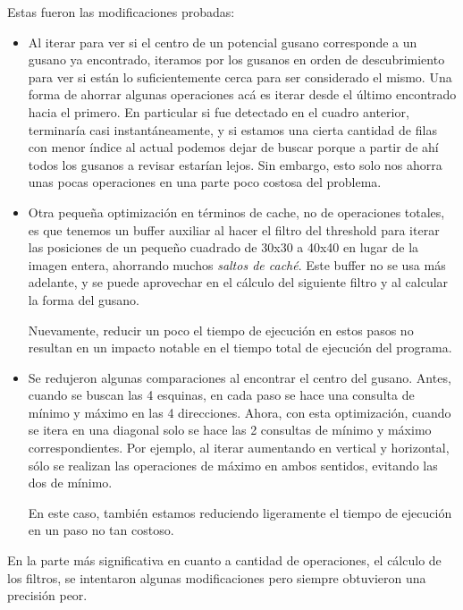 \documentclass{article}
\begin{document}
Estas fueron las modificaciones probadas:
\begin{itemize}

\item Al iterar para ver si el centro de un potencial gusano corresponde a un gusano ya encontrado, iteramos por los gusanos en orden de descubrimiento para ver si están lo suficientemente cerca para ser considerado el mismo. Una forma de ahorrar algunas operaciones acá es iterar desde el último encontrado hacia el primero. En particular si fue detectado en el cuadro anterior, terminaría casi instantáneamente, y si estamos una cierta cantidad de filas con menor índice al actual podemos dejar de buscar porque a partir de ahí todos los gusanos a revisar estarían lejos. Sin embargo, esto solo nos ahorra unas pocas operaciones en una parte poco costosa del problema.

\item Otra pequeña optimización en términos de cache, no de operaciones totales, es que tenemos un buffer auxiliar al hacer el filtro del threshold para iterar las posiciones de un pequeño cuadrado de 30x30 a 40x40 en lugar de la imagen entera, ahorrando muchos \emph{saltos de caché}. Este buffer no se usa más adelante, y se puede aprovechar en el cálculo del siguiente filtro y al calcular la forma del gusano.

Nuevamente, reducir un poco el tiempo de ejecución en estos pasos no resultan en un impacto notable en el tiempo total de ejecución del programa.

\item Se redujeron algunas comparaciones al encontrar el centro del gusano. Antes, cuando se buscan las 4 esquinas, en cada paso se hace una consulta de mínimo y máximo en las 4 direcciones. Ahora, con esta optimización, cuando se itera en una diagonal solo se hace las 2 consultas de mínimo y máximo correspondientes. Por ejemplo, al iterar aumentando en vertical y horizontal, sólo se realizan las operaciones de máximo en ambos sentidos, evitando las dos de mínimo.

En este caso, también estamos reduciendo ligeramente el tiempo de ejecución en un paso no tan costoso.
\end{itemize}

En la parte más significativa en cuanto a cantidad de operaciones, el cálculo de los filtros, se intentaron algunas modificaciones pero siempre obtuvieron una precisión peor.
\end{document}
